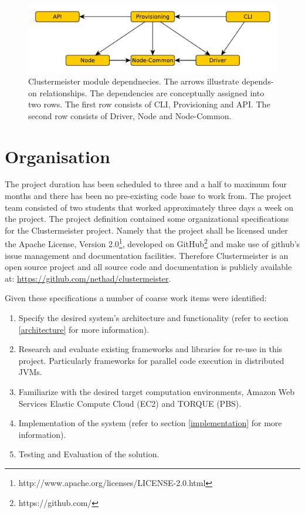 \documentclass[12pt]{article}
\begin{document}
\begin{figure}[hp]
\centering
\includegraphics[scale=0.7]{images/module-deps.pdf}
\caption{Clustermeister module dependnecies. The arrows illustrate depends-on relationships. The dependencies are conceptually assigned into two rows. The first row consists of CLI, Provisioning and API. The second row consists of Driver, Node and Node-Common.}
\label{fig:deps}
\end{figure}

\section{Organisation}

The project duration has been scheduled to three and a half to maximum four months and there has been no pre-existing code base to work from. The project team consisted of two students that worked approximately three days a week on the project. The project definition contained some organizational specifications for the Clustermeister project. Namely that the project shall be licensed under the Apache License, Version 2.0\footnote{http://www.apache.org/licenses/LICENSE-2.0.html}, developed on GitHub\footnote{https://github.com/} and make use of github's issue management and documentation facilities. Therefore Clustermeister is an open source project and all source code and documentation is publicly available at: \url{https://github.com/nethad/clustermeister}.

Given these specifications a number of coarse work items were identified:
\begin{enumerate}
\item \label{wi:spec}Specify the desired system's architecture and functionality (refer to section \ref{architecture} for more information).
\item \label{wi:res}Research and evaluate existing frameworks and libraries for re-use in this project. Particularly frameworks for parallel code execution in distributed JVMs.
\item \label{wi:fam}Familiarize with the desired target computation environments, Amazon Web Services Elastic Compute Cloud (EC2) and TORQUE (PBS).
\item \label{wi:impl}Implementation of the system (refer to section \ref{implementation} for more information).
\item \label{wi:eval}Testing and Evaluation of the solution.
\end{enumerate}
\end{document}
